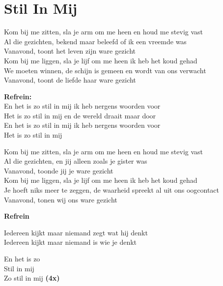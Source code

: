 \section{Stil In Mij}
Kom bij me zitten, sla je arm om me heen en houd me stevig vast\\
Al die gezichten, bekend maar beleefd of ik een vreemde was\\
Vanavond, toont het leven zijn ware gezicht\\
Kom bij me liggen, sla je lijf om me heen ik heb het koud gehad\\
We moeten winnen, de schijn is gemeen en wordt van ons verwacht\\
Vanavond, toont de liefde haar ware gezicht

\textbf{Refrein:}\\
En het is zo stil in mij ik heb nergens woorden voor\\
Het is zo stil in mij en de wereld draait maar door\\
En het is zo stil in mij ik heb nergens woorden voor\\
Het is zo stil in mij

Kom bij me zitten, sla je arm om me heen en houd me stevig vast\\
Al die gezichten, en jij alleen zoals je gister was\\
Vanavond, toonde jij je ware gezicht\\
Kom bij me liggen, sla je lijf om me heen ik heb het koud gehad\\
Je hoeft niks meer te zeggen, de waarheid spreekt al uit ons oogcontact\\
Vanavond, tonen wij ons ware gezicht

\textbf{Refrein}

Iedereen kijkt maar niemand zegt wat hij denkt\\
Iedereen kijkt maar niemand is wie je denkt

En het is zo\\
Stil in mij\\
Zo stil in mij \textbf{(4x)}

